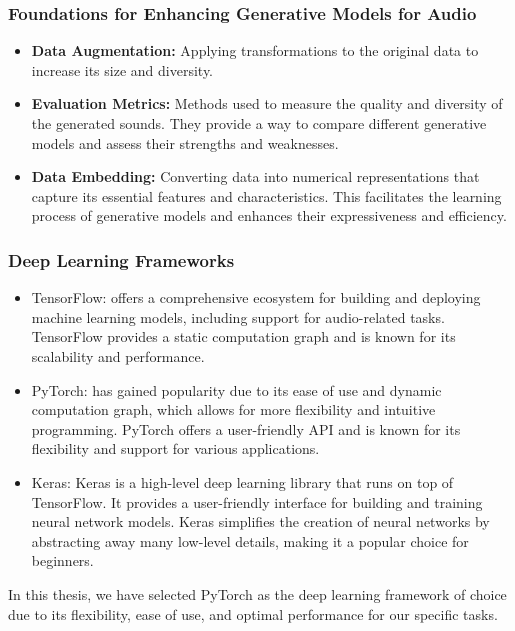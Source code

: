 \begin{frame}
    \frametitle{Foundations for Enhancing Generative Models for Audio}

    \begin{itemize}
        \item \textbf{Data Augmentation:} Applying transformations to the original data to increase its size and diversity.
        \item \textbf{Evaluation Metrics:} Methods used to measure the quality and diversity of the generated sounds. They provide a way to compare different generative models and assess their strengths and weaknesses.
        \item \textbf{Data Embedding:} Converting data into numerical representations that capture its essential features and characteristics. This facilitates the learning process of generative models and enhances their expressiveness and efficiency.
    \end{itemize}

\end{frame}


\begin{frame}
    \frametitle{Deep Learning Frameworks}

    \begin{itemize}
        \item TensorFlow: offers a comprehensive ecosystem for building and deploying machine learning models, including support for audio-related tasks. TensorFlow provides a static computation graph and is known for its scalability and performance.

        \item PyTorch: has gained popularity due to its ease of use and dynamic computation graph, which allows for more flexibility and intuitive programming. PyTorch offers a user-friendly API and is known for its flexibility and support for various applications.

        \item Keras: Keras is a high-level deep learning library that runs on top of TensorFlow. It provides a user-friendly interface for building and training neural network models. Keras simplifies the creation of neural networks by abstracting away many low-level details, making it a popular choice for beginners.

    \end{itemize}

    In this thesis, we have selected PyTorch as the deep learning framework of choice due to its flexibility, ease of use, and optimal performance for our specific tasks.

\end{frame}


